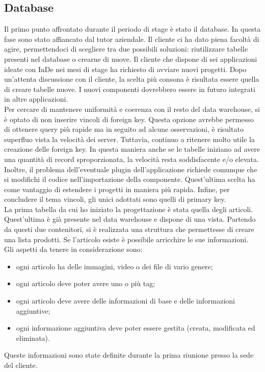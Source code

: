 \subsection{Database}
Il primo punto affrontato durante il periodo di stage è stato il database. In questa fase sono stato affiancato dal tutor aziendale. Il cliente ci ha dato piena facoltà di agire, permettendoci di scegliere tra due possibili soluzioni: riutilizzare tabelle presenti nel database o crearne di nuove. 
Il cliente che dispone di sei applicazioni ideate con InDe nei mesi di stage ha richiesto di avviare nuovi progetti.
Dopo un'attenta discussione con il cliente, la scelta più consona è risultata essere quella di creare tabelle nuove. I nuovi componenti dovrebbero essere in futuro integrati in altre applicazioni.\\
Per cercare di mantenere uniformità e coerenza con il resto del data warehouse, si è optato di non inserire vincoli di foreign key.
Questa opzione avrebbe permesso di ottenere query più rapide ma in seguito ad alcune osservazioni, è risultato superfluo vista la velocità dei server. 
Tuttavia, continuo a ritenere molto utile la creazione delle foreign key. In questa maniera anche se le tabelle iniziano ad avere una quantità di record sproporzionata, la velocità resta soddisfacente e/o elevata. Inoltre, il problema dell'eventuale plugin dell'applicazione richiede comunque che si modifichi il codice nell'importazione della componente. 
Quest'ultima scelta ha come vantaggio di estendere i progetti in maniera più rapida.
Infine, per concludere il tema vincoli, gli unici adottati sono quelli di primary key.
\\

La prima tabella da cui ho iniziato la progettazione è stata quella degli articoli. Quest'ultima è già presente nel data warehouse e dispone di una vista. 
Partendo da questi due contenitori, si è realizzata una struttura che permettesse di creare una lista prodotti. Se l'articolo esiste è possibile arricchire le sue informazioni.\\

Gli aspetti da tenere in considerazione sono:
\begin{itemize}
	\item ogni articolo ha delle immagini, video o dei file di vario genere;
	\item ogni articolo deve poter avere uno o più tag;
	\item ogni articolo deve avere delle informazioni di base e delle informazioni aggiuntive;
	\item ogni informazione aggiuntiva deve poter essere gestita (creata, modificata ed eliminata).
\end{itemize}
Queste informazioni sono state definite durante la prima riunione presso la sede del cliente.\\


